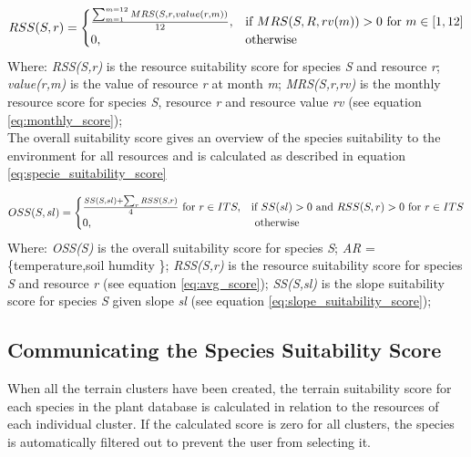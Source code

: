 \begin{equation}
\centering
RSS(S,r) =
\begin{cases}
	\frac{\sum_{m=1}^{m=12} MRS(S,r,value(r,m))}{12}, & \text{if } MRS(S,R,rv(m)) > 0 \text{ for } m \in [1,12] \\
    0,              & \text{otherwise}
\end{cases}
\label{eq:avg_score}
\end{equation}
Where: \textit{RSS(S,r)} is the resource suitability score for species \textit{S} and resource \textit{r}; \textit{value(r,m)} is the value of resource \textit{r} at month \textit{m}; \textit{MRS(S,r,rv)} is the monthly resource score for species \textit{S}, resource \textit{r} and resource value \textit{rv} (see equation \ref{eq:monthly_score});\\

The overall suitability score gives an overview of the species suitability to the environment for all resources and is calculated as described in equation \ref{eq:specie_suitability_score}

\begin{equation}
\begin{split}
\centering
OSS(S,sl) = 
\begin{cases}
	\frac{SS(S,sl) + \sum_{r}^{}RSS(S,r)}{4} \text{ for } r \in ITS, & \text{if } SS(sl) > 0 \text{ and } RSS(S,r) > 0 \text{ for } r \in ITS \\
	0, &\text{ otherwise} \\
\end{cases}
\end{split}
\label{eq:specie_suitability_score}
\end{equation}
Where: \textit{OSS(S)} is the overall suitability score for species \textit{S}; \textit{AR} = \{temperature,soil humdity \}; \textit{RSS(S,r)} is the resource suitability score for species \textit{S} and resource \textit{r} (see equation \ref{eq:avg_score}); \textit{SS(S,sl)} is the slope suitability score for species \textit{S} given slope \textit{sl} (see equation \ref{eq:slope_suitability_score}); 

\subsection{Communicating the Species Suitability Score}

When all the terrain clusters have been created, the terrain suitability score for each species in the plant database is calculated in relation to the resources of each individual cluster. If the calculated score is zero for all clusters, the species is automatically filtered out to prevent the user from selecting it. \\

